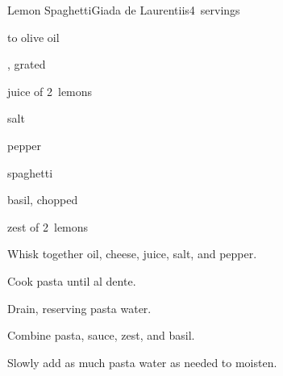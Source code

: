 \begin{recipe}{Lemon Spaghetti}{Giada de Laurentiis}{4~servings}

\begin{ingredients}
\item \half{} to \C{\twothird} olive oil
\item \C{\twothird} , grated
\item juice of 2~lemons
\item \tp{\threequarter} salt
\item \tp{\half} pepper
\item {} spaghetti
\item \C{\third} basil, chopped
\item zest of 2~lemons
\end{ingredients}

\begin{directions}
\item Whisk together oil, cheese, juice, salt, and pepper.
\item Cook pasta until al dente.
\item Drain, reserving  pasta water.
\item Combine pasta, sauce, zest, and basil.
\item Slowly add as much pasta water as needed to moisten.
\end{directions}

\end{recipe}

